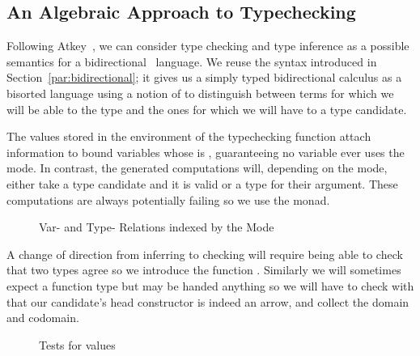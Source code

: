 \subsection{An Algebraic Approach to Typechecking}\label{section:typechecking}

Following Atkey~\citeyear{atkey2015algebraic}, we can consider type checking
and type inference as a possible semantics for a bidirectional~\cite{pierce2000local}
language. We reuse the syntax introduced in Section~\ref{par:bidirectional}; it
gives us a simply typed bidirectional calculus as a bisorted language using
a notion of  to distinguish between terms for which we will be able to
 the type and the ones for which we will have to  a type
candidate.

The values stored in the environment of the typechecking function attach 
information to bound variables whose  is , guaranteeing no
variable ever uses the  mode. In contrast, the generated computations
will, depending on the mode, either take a type candidate and  it is
valid or  a type for their argument. These computations are always
potentially failing so we use the  monad.

\begin{figure}[h]
\begin{minipage}{0.40\textwidth}
\end{minipage}\hfill
\begin{minipage}{0.50\textwidth}
\end{minipage}
\caption{Var- and Type- Relations indexed by the Mode}
\end{figure}

A change of direction from inferring to checking will require being able to check
that two types agree so we introduce the function . Similarly we will
sometimes expect a function type but may be handed anything so we will have to check
with  that our candidate's head constructor is indeed an arrow, and
collect the domain and codomain.

\begin{figure}[h]
\begin{minipage}{0.45\textwidth}
\end{minipage}\hfill
\begin{minipage}{0.45\textwidth}
\end{minipage}
\caption{Tests for  values}
\end{figure}


